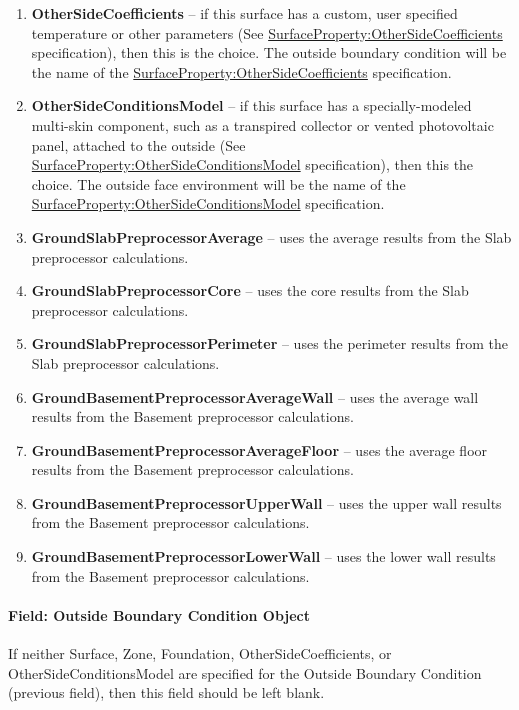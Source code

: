 \begin{enumerate}
  \item
    \textbf{OtherSideCoefficients} -- if this surface has a custom, user specified temperature or other parameters (See \hyperref[surfacepropertyothersidecoefficients]{SurfaceProperty:OtherSideCoefficients} specification), then this is the choice. The outside boundary condition will be the name of the \hyperref[surfacepropertyothersidecoefficients]{SurfaceProperty:OtherSideCoefficients} specification.
  \item
    \textbf{OtherSideConditionsModel} -- if this surface has a specially-modeled multi-skin component, such as a transpired collector or vented photovoltaic panel, attached to the outside (See \hyperref[surfacepropertyothersideconditionsmodel]{SurfaceProperty:OtherSideConditionsModel} specification), then this the choice. The outside face environment will be the name of the \hyperref[surfacepropertyothersideconditionsmodel]{SurfaceProperty:OtherSideConditionsModel} specification.
  \item
    \textbf{GroundSlabPreprocessorAverage} -- uses the average results from the Slab preprocessor calculations.
  \item
    \textbf{GroundSlabPreprocessorCore} -- uses the core results from the Slab preprocessor calculations.
  \item
    \textbf{GroundSlabPreprocessorPerimeter} -- uses the perimeter results from the Slab preprocessor calculations.
  \item
    \textbf{GroundBasementPreprocessorAverageWall} -- uses the average wall results from the Basement preprocessor calculations.
  \item
    \textbf{GroundBasementPreprocessorAverageFloor} -- uses the average floor results from the Basement preprocessor calculations.
  \item
    \textbf{GroundBasementPreprocessorUpperWall} -- uses the upper wall results from the Basement preprocessor calculations.
  \item
    \textbf{GroundBasementPreprocessorLowerWall} -- uses the lower wall results from the Basement preprocessor calculations.
\end{enumerate}

\paragraph{Field: Outside Boundary Condition Object}\label{field-outside-boundary-condition-object-7}

If neither Surface, Zone, Foundation, OtherSideCoefficients, or OtherSideConditionsModel are specified for the Outside Boundary Condition (previous field), then this field should be left blank.

